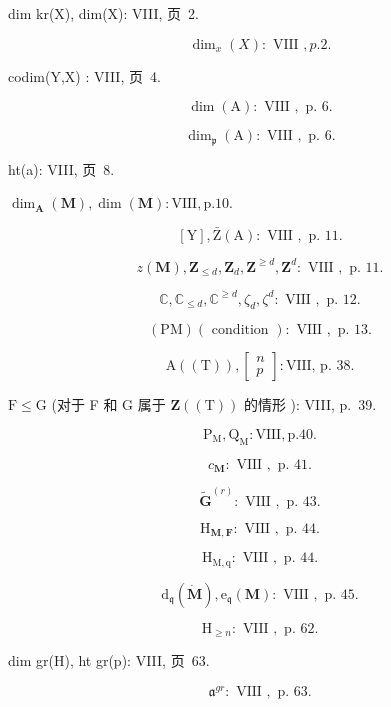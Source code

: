 dim kr(X), dim(X): VIII, 页~2.

\[
\dim_ {x} (X): \text { VIII }, p. 2.
\]

codim(Y,X) : VIII, 页~4.

\[
\dim (\mathrm{A}): \text { VIII }, \text { p. } 6.
\]

\[
\dim_ {\mathfrak {p}} (\mathrm{A}): \text { VIII }, \text { p. } 6.
\]

ht(a): VIII, 页~8.

\(\dim_{\mathbf{A}}(\mathbf{M}), \dim(\mathbf{M}) : \mathrm{VIII}, \mathrm{p.} 10.\)

\[
[ \mathrm{Y} ], \bar {\mathrm{Z}} (\mathrm{A}): \text { VIII }, \text { p. } 11.
\]

\[
z (\mathbf {M}), \mathbf {Z} _ {\leqslant d}, \mathbf {Z} _ {d}, \mathbf {Z} ^ {\geqslant d}, \mathbf {Z} ^ {d}: \text { VIII }, \text { p. } 11.
\]

\[
\mathbb {C}, \mathbb {C} _ {\leqslant d}, \mathbb {C} ^ {\geqslant d}, \zeta_ {d}, \zeta^ {d}: \text { VIII }, \text { p. } 12.
\]

\[
(\mathrm{PM}) (\text { condition }): \text { VIII }, \text { p. } 13.
\]

\[
\mathrm{A} ((\mathrm{T})), \left[ \begin{array}{c} n \\ p \end{array} \right]: \text {VIII, p. 38.}
\]

\(\mathrm{F} \leqslant \mathrm{G}\) (对于 F 和 G 属于 \(\mathbf{Z}((\mathrm{T}))\) 的情形 ): VIII, p.~39.

\[
\mathrm{P} _ {\mathrm{M}}, \mathrm{Q} _ {\mathrm{M}}: \mathrm{VIII}, \text {p.} 40.
\]

\[
c _ {\mathbf {M}}: \text { VIII }, \text { p. } 41.
\]

\[
\tilde {\mathbf {G}} ^ {(r)}: \text { VIII }, \text { p. } 43.
\]

\[
\mathrm{H} _ {\mathbf {M}, \mathbf {F}}: \text { VIII }, \text { p. } 44.
\]

\[
\mathrm{H} _ {\mathrm{M}, \mathrm{q}}: \text { VIII }, \text { p. } 44.
\]

\[
\mathrm{d} _ {\mathfrak {q}} (\dot {\mathbf {M}}), \mathrm{e} _ {\mathfrak {q}} (\mathbf {M}): \text { VIII }, \text { p. } 45.
\]

\[
\mathrm{H} _ {\geqslant n}: \text { VIII }, \text { p. } 62.
\]

dim gr(H), ht gr(p): VIII, 页~63.

\[
\mathfrak {a} ^ {g r}: \text { VIII }, \text { p. } 63.
\]

